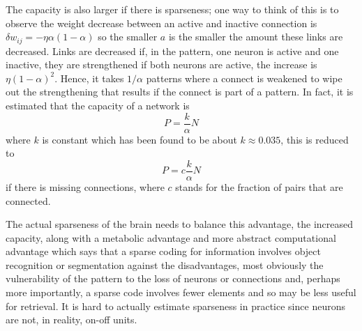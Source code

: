 \documentclass[12pt]{article}
\begin{document}
The capacity is also larger if there is sparseness; one way to think
of this is to observe the weight decrease between an active and
inactive connection is $\delta w_{ij}=-\eta \alpha (1-\alpha)$ so the smaller
$a$ is the smaller the amount these links are decreased. Links are
decreased if, in the pattern, one neuron is active and one inactive,
they are strengthened if both neurons are active, the increase is
$\eta (1-\alpha)^2$. Hence, it takes $1/\alpha$ patterns where a connect is
weakened to wipe out the strengthening that results if the connect is
part of a pattern. In fact, it is estimated that the capacity of a
network is
\begin{equation}
P=\frac{k}{\alpha}N
\end{equation}
where $k$ is constant which has been found to be about $k\approx
0.035$, this is reduced to 
\begin{equation}
P=c\frac{k}{\alpha}N
\end{equation}
if there is missing connections, where $c$ stands for the fraction of pairs that are connected.

The actual sparseness of the brain needs to balance this advantage,
the increased capacity, along with a metabolic advantage and more
abstract computational advantage which says that a sparse coding for
information involves object recognition or segmentation against the
disadvantages, most obviously the vulnerability of the pattern to the
loss of neurons or connections and, perhaps more importantly, a sparse
code involves fewer elements and so may be less useful for
retrieval. It is hard to actually estimate sparseness in practice
since neurons are not, in reality, on-off units.
\end{document}
